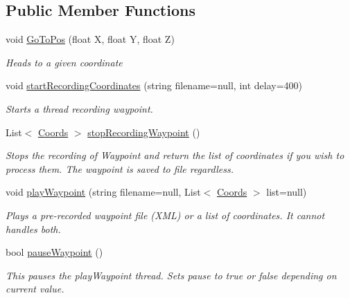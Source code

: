 \subsection*{Public Member Functions}
\begin{DoxyCompactItemize}
\item 
void \hyperlink{classffxivlib_1_1_movement_helper_a7cb94afc3e302ca7a9e4503e43182b2a}{Go\-To\-Pos} (float X, float Y, float Z)
\begin{DoxyCompactList}\small\item\em Heads to a given coordinate \end{DoxyCompactList}\item 
void \hyperlink{classffxivlib_1_1_movement_helper_a2270670d0784b93acc9cc2952118b480}{start\-Recording\-Coordinates} (string filename=null, int delay=400)
\begin{DoxyCompactList}\small\item\em Starts a thread recording waypoint. \end{DoxyCompactList}\item 
List$<$ \hyperlink{structffxivlib_1_1_movement_helper_1_1_coords}{Coords} $>$ \hyperlink{classffxivlib_1_1_movement_helper_a81625fd8f23faf6079d19ddd552b30ba}{stop\-Recording\-Waypoint} ()
\begin{DoxyCompactList}\small\item\em Stops the recording of Waypoint and return the list of coordinates if you wish to process them. The waypoint is saved to file regardless. \end{DoxyCompactList}\item 
void \hyperlink{classffxivlib_1_1_movement_helper_af119b35d20fb48f78a105bb6a5db9b08}{play\-Waypoint} (string filename=null, List$<$ \hyperlink{structffxivlib_1_1_movement_helper_1_1_coords}{Coords} $>$ list=null)
\begin{DoxyCompactList}\small\item\em Plays a pre-\/recorded waypoint file (X\-M\-L) or a list of coordinates. It cannot handles both. \end{DoxyCompactList}\item 
bool \hyperlink{classffxivlib_1_1_movement_helper_a5910202861046f64d46a59fcbcd57076}{pause\-Waypoint} ()
\begin{DoxyCompactList}\small\item\em This pauses the play\-Waypoint thread. Sets pause to true or false depending on current value. \end{DoxyCompactList}\end{DoxyCompactItemize}



